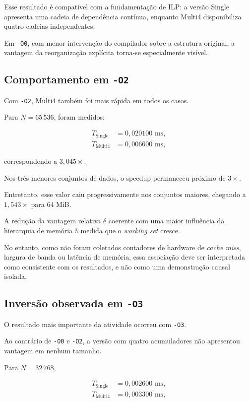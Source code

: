Esse resultado é compatível com a fundamentação de ILP: a versão Single apresenta uma cadeia
de dependência contínua, enquanto Multi4 disponibiliza quatro cadeias independentes.

Em \texttt{-O0}, com menor intervenção do compilador sobre a estrutura original, a vantagem
da reorganização explícita torna-se especialmente visível.


\subsection{Comportamento em \texttt{-O2}}

Com \texttt{-O2}, Multi4 também foi mais rápida em todos os casos.

Para \(N=65\,536\), foram medidos:

\begin{align}
T_{\text{Single}} &= 0{,}020100\text{ ms},\\
T_{\text{Multi4}} &= 0{,}006600\text{ ms},
\end{align}

correspondendo a \(3{,}045\times\).

Nos três menores conjuntos de dados, o speedup permaneceu próximo de \(3\times\).

Entretanto, esse valor caiu progressivamente nos conjuntos maiores, chegando a
\(1{,}543\times\) para 64 MiB.

A redução da vantagem relativa é coerente com uma maior influência da hierarquia de memória
à medida que o \textit{working set} cresce.

No entanto, como não foram coletados contadores de hardware de \textit{cache miss},
largura de banda ou latência de memória, essa associação deve ser interpretada como
consistente com os resultados, e não como uma demonstração causal isolada.


\subsection{Inversão observada em \texttt{-O3}}

O resultado mais importante da atividade ocorreu com \texttt{-O3}.

Ao contrário de \texttt{-O0} e \texttt{-O2}, a versão com quatro acumuladores não apresentou
vantagem em nenhum tamanho.

Para \(N=32\,768\),

\begin{align}
T_{\text{Single}} &= 0{,}002600\text{ ms},\\
T_{\text{Multi4}} &= 0{,}003300\text{ ms},
\end{align}

